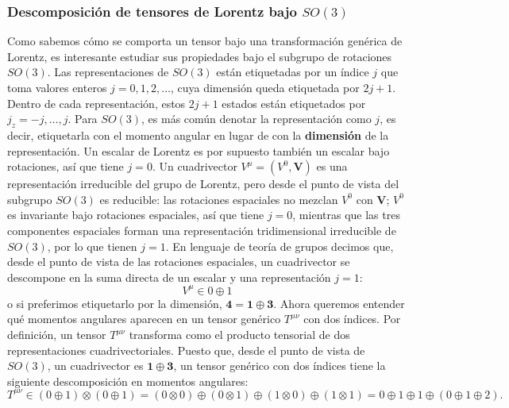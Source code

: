 \documentclass[a4paper,11pt]{book} %
\begin{document}
\subsubsection{Descomposición de tensores de Lorentz bajo $SO(3)$}
\noindent
Como sabemos cómo se comporta un tensor bajo una transformación genérica de Lorentz, es interesante estudiar sus propiedades bajo el subgrupo de rotaciones $SO(3)$.
\medskip\newline
Las representaciones de $SO(3)$ están etiquetadas por un índice $j$ que toma valores enteros $j=0,1,2,\dots$, cuya dimensión queda etiquetada por $2j+1$. Dentro de cada representación, estos $2j+1$ estados están etiquetados por $j_{z}=-j,\dots,j$. Para $SO(3)$, es más común denotar la representación como $j$, es decir, etiquetarla con el momento angular en lugar de con la \textbf{dimensión} de la representación.
\medskip\newline
Un escalar de Lorentz es por supuesto también un escalar bajo rotaciones, así que tiene $j=0$. Un cuadrivector $V^{\mu}=(V^{0},\mathbf{V})$ es una representación irreducible del grupo de Lorentz, pero desde el punto de vista del subgrupo $SO(3)$ es reducible: las rotaciones espaciales no mezclan $V^{0}$ con $\mathbf{V}$; $V^{0}$ es invariante bajo rotaciones espaciales, así que tiene $j=0$, mientras que las tres componentes espaciales forman una representación tridimensional irreducible de $SO(3)$, por lo que tienen $j=1$. En lenguaje de teoría de grupos decimos que, desde el punto de vista de las rotaciones espaciales, un cuadrivector se descompone en la suma directa de un escalar y una representación $j=1$:
\begin{equation}
V^{\mu}\in{0}\oplus{1}
\end{equation}
o si preferimos etiquetarlo por la dimensión, $\mathbf{4}=\mathbf{1}\oplus\mathbf{3}$.
\medskip\newline
Ahora queremos entender qué momentos angulares aparecen en un tensor genérico $T^{\mu\nu}$ con dos índices. Por definición, un tensor $T^{\mu\nu}$ transforma como el producto tensorial de dos representaciones cuadrivectoriales. Puesto que, desde el punto de vista de $SO(3)$, un cuadrivector es $\mathbf{1}\oplus\mathbf{3}$, un tensor genérico con dos índices tiene la siguiente descomposición en momentos angulares:
\begin{equation}
T^{\mu\nu}\in(0\oplus 1)\otimes(0\oplus 1)=(0\otimes 0)\oplus(0\otimes 1)\oplus(1\otimes 0)\oplus(1\otimes 1)=0\oplus 1\oplus 1\oplus(0\oplus 1\oplus 2).
\end{equation}
\end{document}
